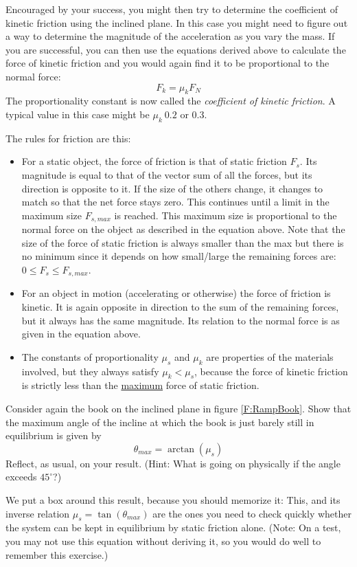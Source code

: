 Encouraged by your success, you might then try to determine the coefficient of kinetic friction using the inclined plane. In this case you might need to figure out a way to determine the magnitude of the acceleration as you vary the mass. If you are successful, you can then use the equations derived above to calculate the force of kinetic friction and you would again find it to be proportional to the normal force: 
$$
F_k = μ_k F_N
$$
The proportionality constant is now called the {\em coefficient of kinetic friction}. A typical value in this case might be $μ_k ~ 0.2$ or $0.3$. 

The rules for friction are this: 
\begin{itemize}
\item For a static object, the force of friction is that of static friction $F_s$. Its magnitude is equal to that of the vector sum of all the forces, but its direction is opposite to it. If the size of the others change, it changes to match so that the net force stays zero. This continues until a limit in the maximum size $F_{s,max}$ is reached. This maximum size is proportional to the normal force on the object as described in the equation above. Note that the size of the force of static friction is always smaller than the max but there is no minimum since it depends on how small/large the remaining forces are: $0 ≤ F_s ≤  F_{s,max}$.
\item For an object in motion (accelerating or otherwise) the force of friction is kinetic. It is again opposite in direction to the sum of the remaining forces, but it always has the same magnitude. Its relation to the normal force is as given in the equation above. 
\item The constants of proportionality $μ_s$ and $μ_k$ are properties of the materials involved, but they always satisfy $μ_k < μ_s$, because the force of kinetic friction is strictly less than the \underline{maximum} force of static friction. 
\end{itemize}

\begin{exercise}
Consider again the book on the inclined plane in figure \ref{F:RampBook}. Show that the maximum angle of the incline at which the book is just barely still in equilibrium is given by
$$
\boxed{θ_{max} = \arctan (μ_s)}
$$
Reflect, as usual, on your result. (Hint: What is going on physically if the angle exceeds $45^∘$?)
\end{exercise}
We put a box around this result, because you should memorize it: This, and its inverse relation $μ_s = \tan (θ_{max})$ are the ones you need to check quickly whether the system can be kept in equilibrium by static friction alone. (Note: On a test, you may not use this equation without deriving it, so you would do well to remember this exercise.)

